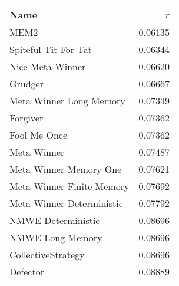 \begin{tabular}{lr}
\toprule
Name                      &  $\bar{r}$ \\
\midrule
MEM2                      &    0.06135 \\
Spiteful Tit For Tat      &    0.06344 \\
Nice Meta Winner          &    0.06620 \\
Grudger                   &    0.06667 \\
Meta Winner Long Memory   &    0.07339 \\
Forgiver                  &    0.07362 \\
Fool Me Once              &    0.07362 \\
Meta Winner               &    0.07487 \\
Meta Winner Memory One    &    0.07621 \\
Meta Winner Finite Memory &    0.07692 \\
Meta Winner Deterministic &    0.07792 \\
NMWE Deterministic        &    0.08696 \\
NMWE Long Memory          &    0.08696 \\
CollectiveStrategy        &    0.08696 \\
Defector                  &    0.08889 \\
\bottomrule
\end{tabular}
